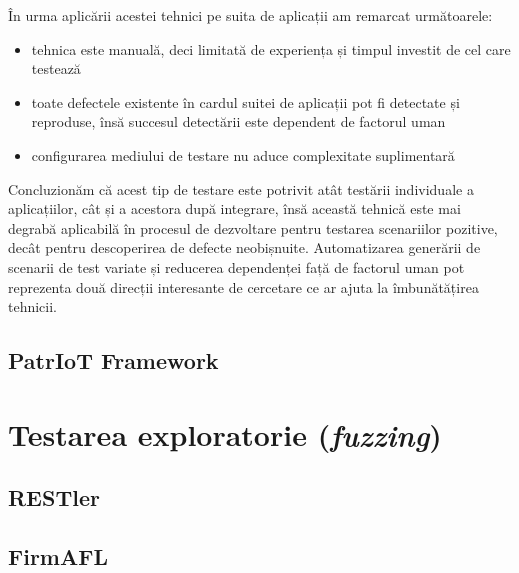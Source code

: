 În urma aplicării acestei tehnici pe suita de aplicații am remarcat următoarele:
\begin{itemize}
    \item tehnica este manuală, deci limitată de experiența și timpul investit de cel care testează
    \item toate defectele existente în cardul suitei de aplicații pot fi detectate și reproduse, însă succesul detectării este dependent de factorul uman
    \item configurarea mediului de testare nu aduce complexitate suplimentară
\end{itemize}

Concluzionăm că acest tip de testare este potrivit atât testării individuale a aplicațiilor, cât și a acestora după integrare, însă această tehnică este mai degrabă aplicabilă în procesul de dezvoltare pentru testarea scenariilor pozitive, decât pentru descoperirea de defecte neobișnuite. Automatizarea generării de scenarii de test variate și reducerea dependenței față de factorul uman pot reprezenta două direcții interesante de cercetare ce ar ajuta la îmbunătățirea tehnicii.

\subsection{PatrIoT Framework}


\section{Testarea exploratorie (\emph{fuzzing})}


\subsection{RESTler}



\subsection{FirmAFL}

